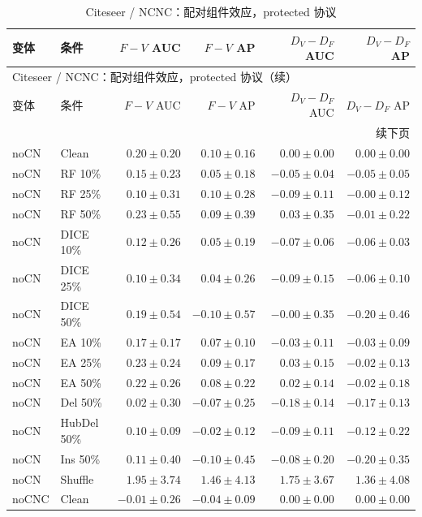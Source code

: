 {\footnotesize
\setlength{\tabcolsep}{3.2pt}
\renewcommand{\arraystretch}{1.10}
\begin{longtable}{llrrrr}
\caption{Citeseer / NCNC：配对组件效应，protected 协议}\\
\toprule
变体 & 条件 & $F-V$ AUC & $F-V$ AP & $D_V-D_F$ AUC & $D_V-D_F$ AP \\
\midrule
\endfirsthead
\multicolumn{6}{l}{Citeseer / NCNC：配对组件效应，protected 协议（续）}\\
\toprule
变体 & 条件 & $F-V$ AUC & $F-V$ AP & $D_V-D_F$ AUC & $D_V-D_F$ AP \\
\midrule
\endhead
\midrule\multicolumn{6}{r}{续下页}\\
\endfoot
\bottomrule
\endlastfoot
noCN & Clean & $0.20\pm0.20$ & $0.10\pm0.16$ & $0.00\pm0.00$ & $0.00\pm0.00$ \\
noCN & RF 10\% & $0.15\pm0.23$ & $0.05\pm0.18$ & $-0.05\pm0.04$ & $-0.05\pm0.05$ \\
noCN & RF 25\% & $0.10\pm0.31$ & $0.10\pm0.28$ & $-0.09\pm0.11$ & $-0.00\pm0.12$ \\
noCN & RF 50\% & $0.23\pm0.55$ & $0.09\pm0.39$ & $0.03\pm0.35$ & $-0.01\pm0.22$ \\
noCN & DICE 10\% & $0.12\pm0.26$ & $0.05\pm0.19$ & $-0.07\pm0.06$ & $-0.06\pm0.03$ \\
noCN & DICE 25\% & $0.10\pm0.34$ & $0.04\pm0.26$ & $-0.09\pm0.15$ & $-0.06\pm0.10$ \\
noCN & DICE 50\% & $0.19\pm0.54$ & $-0.10\pm0.57$ & $-0.00\pm0.35$ & $-0.20\pm0.46$ \\
noCN & EA 10\% & $0.17\pm0.17$ & $0.07\pm0.10$ & $-0.03\pm0.11$ & $-0.03\pm0.09$ \\
noCN & EA 25\% & $0.23\pm0.24$ & $0.09\pm0.17$ & $0.03\pm0.15$ & $-0.02\pm0.13$ \\
noCN & EA 50\% & $0.22\pm0.26$ & $0.08\pm0.22$ & $0.02\pm0.14$ & $-0.02\pm0.18$ \\
noCN & Del 50\% & $0.02\pm0.30$ & $-0.07\pm0.25$ & $-0.18\pm0.14$ & $-0.17\pm0.13$ \\
noCN & HubDel 50\% & $0.10\pm0.09$ & $-0.02\pm0.12$ & $-0.09\pm0.11$ & $-0.12\pm0.22$ \\
noCN & Ins 50\% & $0.11\pm0.40$ & $-0.10\pm0.45$ & $-0.08\pm0.20$ & $-0.20\pm0.35$ \\
noCN & Shuffle & $1.95\pm3.74$ & $1.46\pm4.13$ & $1.75\pm3.67$ & $1.36\pm4.08$ \\
noCNC & Clean & $-0.01\pm0.26$ & $-0.04\pm0.09$ & $0.00\pm0.00$ & $0.00\pm0.00$ \\

\end{longtable}}
